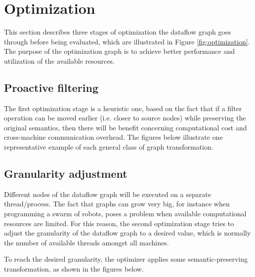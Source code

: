 \documentclass[sigplan,review,anonymous]{acmart}
\begin{document}

\section{Optimization} \label{sec:optimization}

This section describes three stages of optimization the dataflow graph goes
through before being evaluated, which are illustrated in Figure \ref{fig:optimization}.
The purpose of the optimization graph is to achieve better performance and
utilization of the available resources.


\subsection{Proactive filtering}

The first optimization stage is a heuristic one, based on the fact that if a
filter operation can be moved earlier (i.e. closer to source nodes) while
preserving the original semantics, then there will be benefit concerning
computational cost and cross-machine communication overhead. The figures below
illustrate one representative example of each general class of
graph transformation.


\subsection{Granularity adjustment}

Different nodes of the dataflow graph will be executed on a separate
thread/process. The fact that graphs can grow very big, for instance when
programming a swarm of robots, poses a problem when available
computational resources are limited. For this reason, the second optimization
stage tries to adjust the granularity of the dataflow graph to a desired value,
which is normally the number of available threads amongst all machines.

To reach the desired granularity, the optimizer applies some semantic-preserving
transformation, as shown in the figures below.

\end{document}

